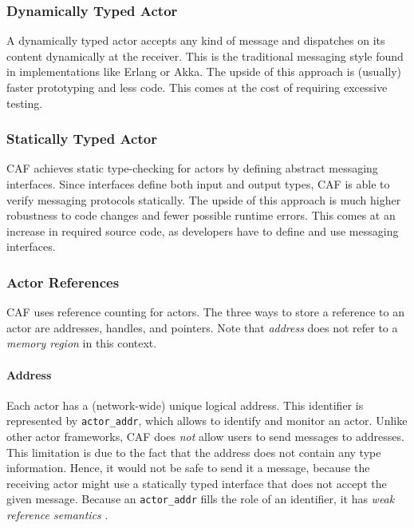 \subsubsection{Dynamically Typed Actor}

A dynamically typed actor accepts any kind of message and dispatches on its
content dynamically at the receiver. This is the traditional messaging style
found in implementations like Erlang or Akka. The upside of this approach is
(usually) faster prototyping and less code. This comes at the cost of requiring
excessive testing.

\subsubsection{Statically Typed Actor}

CAF achieves static type-checking for actors by defining abstract messaging
interfaces. Since interfaces define both input and output types, CAF is able to
verify messaging protocols statically. The upside of this approach is much
higher robustness to code changes and fewer possible runtime errors. This comes
at an increase in required source code, as developers have to define and use
messaging interfaces.

\subsubsection{Actor References}
\label{actor-reference}

CAF uses reference counting for actors. The three ways to store a reference to
an actor are addresses, handles, and pointers. Note that \emph{address} does
not refer to a \emph{memory region} in this context.

\paragraph{Address}
\label{actor-address}

Each actor has a (network-wide) unique logical address. This identifier is
represented by \lstinline^actor_addr^, which allows to identify and monitor an
actor. Unlike other actor frameworks, CAF does \emph{not} allow users to send
messages to addresses. This limitation is due to the fact that the address does
not contain any type information. Hence, it would not be safe to send it a
message, because the receiving actor might use a statically typed interface
that does not accept the given message. Because an \lstinline^actor_addr^ fills
the role of an identifier, it has \emph{weak reference semantics}
.


